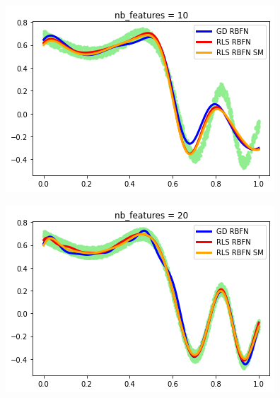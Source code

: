 \documentclass[french,12pt]{article}
\begin{document}
\begin{figure}[ht]
\centering
\begin{minipage}{.45\textwidth}
	\centering
	\includegraphics[width=\textwidth]{incr_rbfn_10feat.png}
	\label{fig:incr_rbfn_10feat}
\end{minipage}
\hfill
\begin{minipage}{.45\textwidth}
	\centering
	\includegraphics[width=\textwidth]{incr_rbfn_20feat.png}
	\label{fig:incr_rbfn_20feat}
\end{minipage}
\begin{minipage}{.45\textwidth}
	\centering

\end{minipage}
\end{figure}
\end{document}

